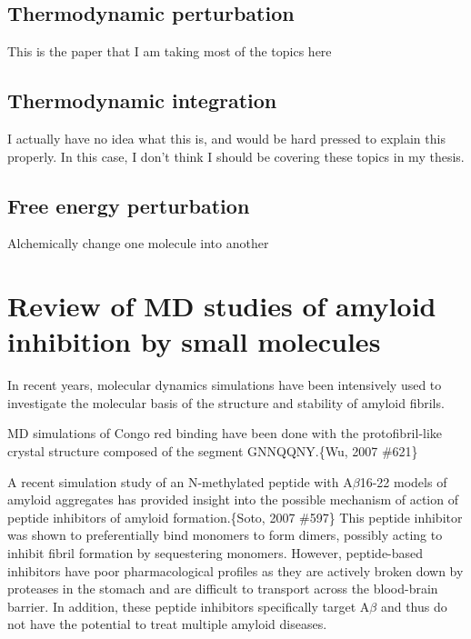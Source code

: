 \subsection{Thermodynamic perturbation}
This is the paper that I am taking most of the topics here\cite{Gilson:2007hz}

\subsection{Thermodynamic integration}
I actually have no idea what this is, and would be hard pressed to explain this properly.
In this case, I don't think I should be covering these topics in my thesis.

\subsection{Free energy perturbation}
Alchemically change one molecule into another

\section{Review of MD studies of amyloid inhibition by small molecules}

\begin{outline}
	\1 In recent years, molecular dynamics simulations have been intensively used to investigate the molecular basis of the structure and stability of amyloid fibrils. 
	
	\1 MD simulations of Congo red binding have been done with the protofibril-like crystal structure composed of the segment GNNQQNY.\{Wu, 2007 \#621\}
	
	\1 A recent simulation study of an N-methylated peptide with A$\beta$16-22 models of amyloid aggregates has provided insight into the possible mechanism of action of peptide inhibitors of amyloid formation.\{Soto, 2007 \#597\} This peptide inhibitor was shown to preferentially bind monomers to form dimers, possibly acting to inhibit fibril formation by sequestering monomers. However, peptide-based inhibitors have poor pharmacological profiles as they are actively broken down by proteases in the stomach and are difficult to transport across the blood-brain barrier. In addition, these peptide inhibitors specifically target A$\beta$ and thus do not have the potential to treat multiple amyloid diseases.
\end{outline}

